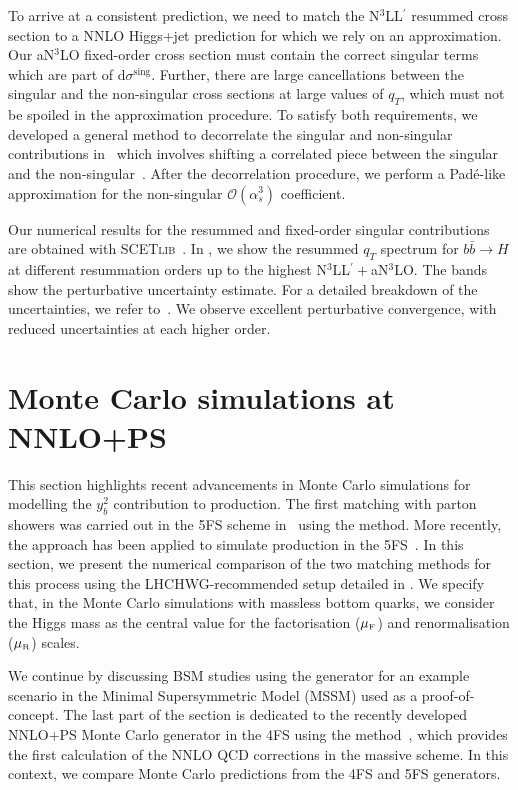 \documentclass[11pt,a4paper]{article}
\begin{document}
To arrive at a consistent prediction, we need to match the N$^3$LL$^{\prime}$ resummed cross section to a NNLO Higgs+jet prediction for which we rely on an approximation. 
Our aN$^3$LO fixed-order cross section must contain the correct singular terms which are part of $\mathrm{d} \sigma^\mathrm{sing}$.
Further, there are large cancellations between the singular and the non-singular cross sections at large values of $q_T$, which must not be spoiled in the approximation procedure.
To satisfy both requirements,
we developed a general method to decorrelate the singular and non-singular contributions in~ which involves shifting a correlated piece between the singular and the non-singular~\cite{Dehnadi:2022prz}.
After the decorrelation procedure, we perform a Pad\'e-like approximation for the non-singular $\mathcal{O}\left(\alpha_s^3\right)$ coefficient. 

Our numerical results for the
resummed and fixed-order singular contributions are obtained with
\textsc{SCETlib}~\cite{scetlib}.
In , we show the resummed $q_T$ spectrum for $b\bar{b}\to H$ at different resummation orders up to the highest N$^3$LL$^{\prime}+$aN$^3$LO. The bands show the perturbative uncertainty estimate. For a detailed breakdown of the uncertainties, we refer to~. We observe excellent perturbative convergence, with reduced uncertainties at each higher order.

\section{Monte Carlo simulations at NNLO+PS}\label{sec:MCyb}
This section highlights recent advancements in Monte Carlo simulations for modelling the $y_b^2$ contribution to \bbH{} production. The first matching with parton showers was carried out in the 5FS scheme in~ using the \minnlo{} method. More recently, the \GENEVA{} approach has been applied to 
simulate \bbtoH{} production in the 5FS~\cite{Gavardi:2025zpf}. In this section, we present the numerical comparison of the two matching 
methods for this process using the LHCHWG-recommended setup 
detailed in . We specify that, in the Monte Carlo simulations with massless bottom quarks, we consider the Higgs mass as the central value for the factorisation ($\muF$) and renormalisation ($\muR$) scales. 

We continue by discussing BSM studies using the \minnlo{} generator for an example scenario in the Minimal Supersymmetric Model (MSSM) used as a proof-of-concept. 
The last part of the section is dedicated to the recently developed NNLO+PS Monte Carlo generator in the 4FS using the \minnlo{} method~\cite{Biello:2024pgo}, 
which provides the first calculation of the NNLO QCD corrections in the massive scheme. In this context, we compare Monte Carlo predictions from the 
4FS and 5FS \minnlo{} generators.
\end{document}
